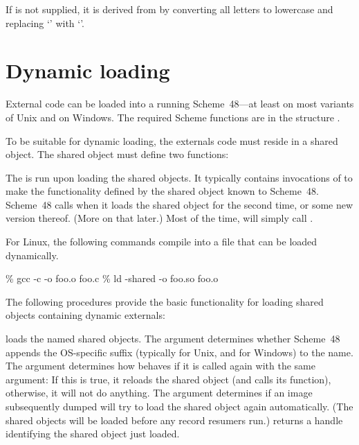 \noindent{}
If  is not supplied, it is derived from  by converting
 all letters to lowercase and replacing `\code{-}' with `\code{\_}'.

\section{Dynamic loading}
\label{dynamic-externals}

External code can be loaded into a running Scheme~48---at least on
most variants of Unix and on Windows.  The required Scheme functions
are in the structure .

To be suitable for dynamic loading, the externals code must reside in
a shared object.  The shared object must define two functions:
%
\begin{protos}
\end{protos}
%
The  is run upon loading the shared objects.  It
typically contains invocations of  to
make the functionality defined by the shared object known to
Scheme~48.  Scheme~48 calls  when it loads the
shared object for the second time, or some new version thereof.  (More
on that later.)  Most of the time,  will simply
call .

For Linux, the following commands compile  into a file
 that can be loaded dynamically.
\begin{example}
\% gcc -c -o foo.o foo.c
\% ld -shared -o foo.so foo.o
\end{example}
%
The following procedures provide the basic functionality for loading
shared objects containing dynamic externals:
%
\begin{protos}
\end{protos}
%
 loads the
named shared objects.  The  argument determines whether
Scheme~48 appends the OS-specific suffix (typically  for
Unix, and  for Windows) to the name.  The 
argument determines how  behaves if it is
called again with the same argument: If this is true, it reloads the
shared object (and calls its  function),
otherwise, it will not do anything.  The   argument
determines if an image subsequently dumped will try to load the shared
object again automatically.  (The shared objects will be loaded before
any record resumers run.)   returns a
handle identifying the shared object just loaded.

